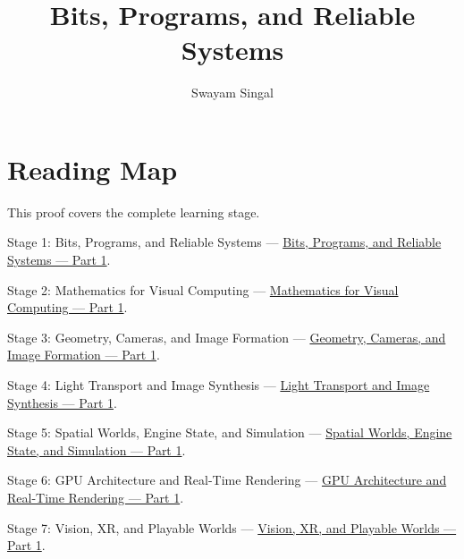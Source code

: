 \documentclass[11pt,twoside,openany]{book}
\title{Bits, Programs, and Reliable Systems}
\author{Swayam Singal}
\begin{document}
\maketitle
\begin{center}\end{center}
\chapter*{Reading Map}
\hypertarget{volume-reading-map}{}
\noindent This proof covers the complete learning stage.
\par\noindent Stage 1: Bits, Programs, and Reliable Systems --- \href{../01-Bits-Programs-and-Reliable-Systems-P01/main.pdf}{Bits, Programs, and Reliable Systems — Part 1}.
\par\noindent Stage 2: Mathematics for Visual Computing --- \href{../02-Mathematics-for-Visual-Computing-P01/main.pdf}{Mathematics for Visual Computing — Part 1}.
\par\noindent Stage 3: Geometry, Cameras, and Image Formation --- \href{../03-Geometry-Cameras-and-Image-Formation-P01/main.pdf}{Geometry, Cameras, and Image Formation — Part 1}.
\par\noindent Stage 4: Light Transport and Image Synthesis --- \href{../04-Light-Transport-and-Image-Synthesis-P01/main.pdf}{Light Transport and Image Synthesis — Part 1}.
\par\noindent Stage 5: Spatial Worlds, Engine State, and Simulation --- \href{../05-Spatial-Worlds-Engine-State-and-Simulation-P01/main.pdf}{Spatial Worlds, Engine State, and Simulation — Part 1}.
\par\noindent Stage 6: GPU Architecture and Real-Time Rendering --- \href{../06-GPU-Architecture-and-Real-Time-Rendering-P01/main.pdf}{GPU Architecture and Real-Time Rendering — Part 1}.
\par\noindent Stage 7: Vision, XR, and Playable Worlds --- \href{../07-Vision-XR-and-Playable-Worlds-P01/main.pdf}{Vision, XR, and Playable Worlds — Part 1}.
\tableofcontents
\mainmatter
\setcounter{chapter}{0}





\end{document}
